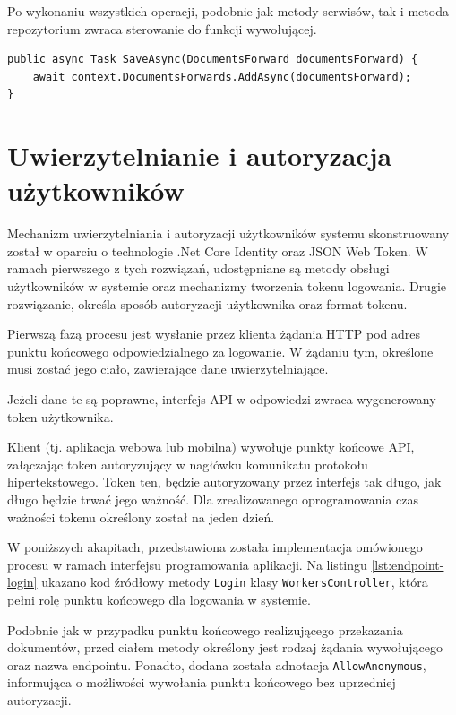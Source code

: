 Po wykonaniu wszystkich operacji, podobnie jak metody serwisów, tak i metoda repozytorium zwraca sterowanie do funkcji wywołującej.

\begin{lstlisting}[label=lst:repository-forward-worker,caption=Kod metody repozytorium odpowiedzialnej za przekazywanie dokumentów pracownikowi, captionpos=b,basicstyle=\footnotesize\ttfamily,style=sharpcstyle,language={[Sharp]C}]
public async Task SaveAsync(DocumentsForward documentsForward) {
	await context.DocumentsForwards.AddAsync(documentsForward);
}
\end{lstlisting}

\section{Uwierzytelnianie i autoryzacja użytkowników}
Mechanizm uwierzytelniania i autoryzacji użytkowników systemu skonstruowany został w oparciu o technologie .Net Core Identity oraz JSON Web Token. W ramach pierwszego z tych rozwiązań, udostępniane są metody obsługi użytkowników w systemie oraz mechanizmy tworzenia tokenu logowania. Drugie rozwiązanie, określa sposób autoryzacji użytkownika oraz format tokenu.

Pierwszą fazą procesu jest wysłanie przez klienta żądania HTTP pod adres punktu końcowego odpowiedzialnego za logowanie. W żądaniu tym, określone musi zostać jego ciało, zawierające dane uwierzytelniające.

Jeżeli dane te są poprawne, interfejs API w odpowiedzi zwraca wygenerowany token użytkownika.

Klient (tj. aplikacja webowa lub mobilna) wywołuje punkty końcowe API, załączając token autoryzujący w nagłówku komunikatu protokołu hipertekstowego. Token ten, będzie autoryzowany przez interfejs tak długo, jak długo będzie trwać jego ważność. Dla zrealizowanego oprogramowania czas ważności tokenu określony został na jeden dzień.

W poniższych akapitach, przedstawiona została implementacja omówionego procesu w ramach interfejsu programowania aplikacji. Na listingu \ref{lst:endpoint-login} ukazano kod źródłowy metody \texttt{Login} klasy \texttt{WorkersController}, która pełni rolę punktu końcowego dla logowania w systemie.

Podobnie jak w przypadku punktu końcowego realizującego przekazania dokumentów, przed ciałem metody określony jest rodzaj żądania wywołującego oraz nazwa endpointu. Ponadto, dodana została adnotacja \texttt{AllowAnonymous}, informująca o możliwości wywołania punktu końcowego bez uprzedniej autoryzacji.

